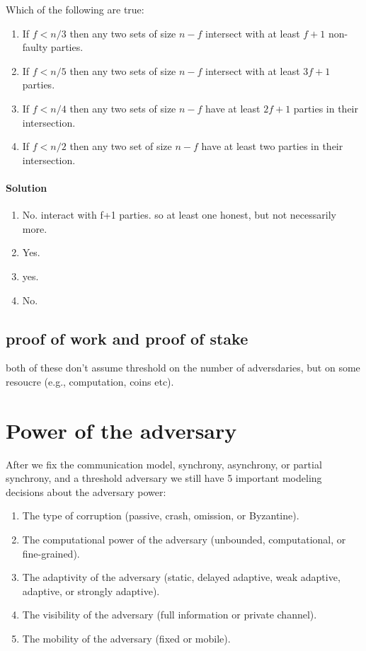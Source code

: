\begin{xca}
    Which of the following are true:
    \begin{enumerate}
        \item If $f<n/3$ then any two sets of size $n-f$ intersect with at least $f+1$ non-faulty parties.
        \item If $f<n/5$ then any two sets of size $n-f$ intersect with at least $3f+1$ parties.
        \item If $f<n/4$ then any two sets of size $n-f$ have at least $2f+1$ parties in their intersection.
        \item If $f<n/2$ then any two set of size $n-f$ have at least two parties in their intersection.    
    \end{enumerate}

    \paragraph{Solution}
    \begin{enumerate}
        \item No. interact with f+1 parties. so at least one honest, but not necessarily more.
        \item Yes.
        \item yes.
        \item No.
    \end{enumerate}
\end{xca}

\subsection{proof of work and proof of stake}
both of these don't assume threshold on the number of adversdaries, but on some resoucre (e.g., computation, coins etc).
\section{Power of the adversary}
After we fix the communication model, synchrony, asynchrony, or partial synchrony, 
and a threshold adversary we still have 5 important modeling decisions about the adversary power:
\begin{enumerate}
    \item The type of corruption (passive, crash, omission, or Byzantine).
    \item The computational power of the adversary (unbounded, computational, or fine-grained).
    \item The adaptivity of the adversary (static, delayed adaptive, weak adaptive, adaptive, or strongly adaptive).
    \item The visibility of the adversary (full information or private channel).
    \item The mobility of the adversary (fixed or mobile).
\end{enumerate}



